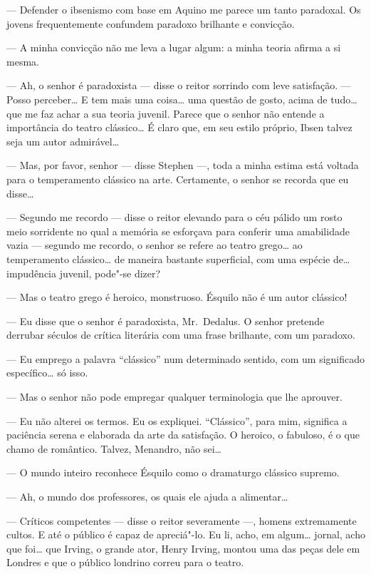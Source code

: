 --- Defender o ibsenismo com base em Aquino me parece um tanto
paradoxal.  Os jovens frequentemente confundem paradoxo brilhante e
convicção.

--- A minha convicção não me leva a lugar algum: a minha teoria
afirma a si mesma.

--- Ah, o senhor é paradoxista --- disse o reitor sorrindo com leve
satisfação.  --- Posso perceber\ldots{}  E tem mais uma coisa\ldots{} uma questão
de gosto, acima de tudo\ldots{} que me faz achar a sua teoria juvenil.
Parece que o senhor não entende a importância do teatro clássico\ldots{}  É
claro que, em seu estilo próprio, Ibsen talvez seja um autor
admirável\ldots{}

--- Mas, por favor, senhor --- disse Stephen ---, toda a minha
estima está voltada para o temperamento clássico na arte.  Certamente,
o senhor se recorda que eu disse\ldots{}

--- Segundo me recordo --- disse o reitor elevando para o céu
pálido um rosto meio sorridente no qual a memória se esforçava para
conferir uma amabilidade vazia --- segundo me recordo, o senhor se refere
ao teatro grego\ldots{} ao temperamento clássico\ldots{} de maneira bastante
superficial, com uma espécie de\ldots{} impudência juvenil, pode"-se dizer?

--- Mas o teatro grego é heroico, monstruoso.  Ésquilo não é um
autor clássico!

--- Eu disse que o senhor é paradoxista, Mr.~Dedalus.  O senhor
pretende derrubar séculos de crítica literária com uma frase brilhante,
com um paradoxo.

--- Eu emprego a palavra “clássico” num determinado sentido, com
um significado específico\ldots{} só isso.

--- Mas o senhor não pode empregar qualquer terminologia que lhe
aprouver.

--- Eu não alterei os termos.  Eu os expliquei.  “Clássico”, para
mim, significa a paciência serena e elaborada da arte da satisfação.  O
heroico, o fabuloso, é o que chamo de romântico.  Talvez, Menandro, não
sei\ldots{}

--- O mundo inteiro reconhece Ésquilo como o dramaturgo clássico
supremo.

--- Ah, o mundo dos professores, os quais ele ajuda a
alimentar\ldots{}

--- Críticos competentes --- disse o reitor severamente ---,
homens extremamente cultos.  E até o público é capaz de apreciá"-lo.  Eu
li, acho, em algum\ldots{} jornal, acho que foi\ldots{} que Irving, o grande
ator, Henry Irving, montou uma das peças dele em Londres e que o
público londrino correu para o teatro.


